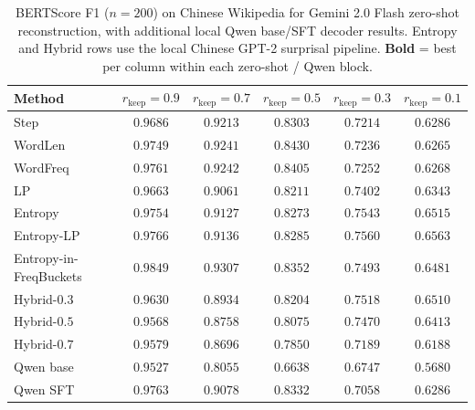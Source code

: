 \documentclass[11pt]{article}
\newcommand{\rkeep}{r_{\mathrm{keep}}}
\begin{document}
\begin{table}[tbp]
\centering
\small
\caption{BERTScore F1 ($n=200$) on Chinese Wikipedia
for Gemini 2.0 Flash zero-shot reconstruction, with additional local Qwen
base/SFT decoder results.
Entropy and Hybrid rows use the local Chinese GPT-2 surprisal pipeline.
\textbf{Bold} = best per column within each zero-shot / Qwen block.}
\label{tab:chinese_wiki_bertscore}
\begin{tabular}{lccccc}
\toprule
\textbf{Method} & $\rkeep{=}0.9$ & $\rkeep{=}0.7$ & $\rkeep{=}0.5$ & $\rkeep{=}0.3$ & $\rkeep{=}0.1$ \\
\midrule
Step              & $0.9686$ & $0.9213$ & $0.8303$ & $0.7214$ & $0.6286$ \\
WordLen       & $0.9749$ & $0.9241$ & $\mathbf{0.8430}$ & $0.7236$ & $0.6265$ \\
WordFreq    & $0.9761$ & $0.9242$ & $0.8405$ & $0.7252$ & $0.6268$ \\
LP   & $0.9663$ & $0.9061$ & $0.8211$ & $0.7402$ & $0.6343$ \\
Entropy                 & $0.9754$ & $0.9127$ & $0.8273$ & $0.7543$ & $0.6515$ \\
Entropy-LP              & $0.9766$ & $0.9136$ & $0.8285$ & $\mathbf{0.7560}$ & $\mathbf{0.6563}$ \\
Entropy-in-FreqBuckets  & $\mathbf{0.9849}$ & $\mathbf{0.9307}$ & $0.8352$ & $0.7493$ & $0.6481$ \\
Hybrid-$0.3$            & $0.9630$ & $0.8934$ & $0.8204$ & $0.7518$ & $0.6510$ \\
Hybrid-$0.5$            & $0.9568$ & $0.8758$ & $0.8075$ & $0.7470$ & $0.6413$ \\
Hybrid-$0.7$            & $0.9579$ & $0.8696$ & $0.7850$ & $0.7189$ & $0.6188$ \\
\midrule
Qwen base              & $0.9527$ & $0.8055$ & $0.6638$ & $0.6747$ & $0.5680$ \\
Qwen SFT               & $\mathbf{0.9763}$ & $\mathbf{0.9078}$ & $\mathbf{0.8332}$ & $\mathbf{0.7058}$ & $\mathbf{0.6286}$ \\
\bottomrule
\end{tabular}
\end{table}
\end{document}
